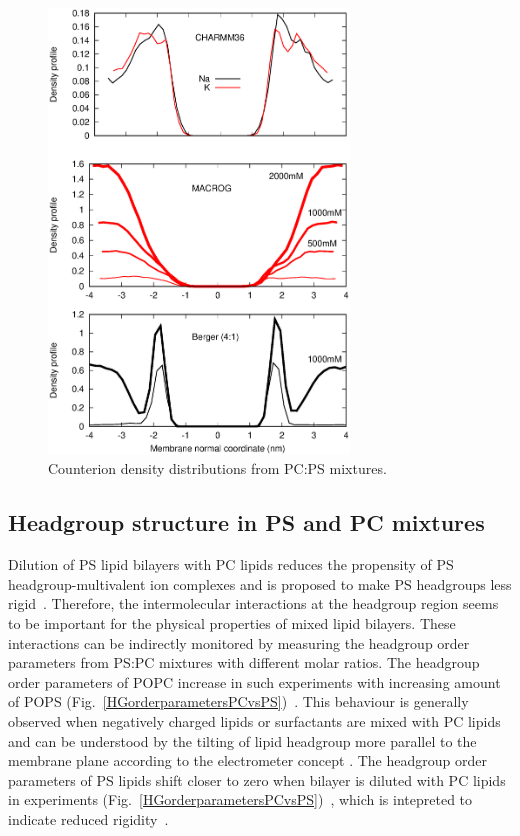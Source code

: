 \documentclass[aps,prl,superscriptaddress,twocolumn]{revtex4}
\begin{document}
\begin{figure}[]
  \centering
  \includegraphics[width=8.0cm]{../Figs/CIdensPSOCmixt.eps}
  \caption{  Counterion density distributions from PC:PS mixtures.
\label{CIdensPSOCmixt}
  }
\end{figure}




\subsection{Headgroup structure in PS and PC mixtures}
Dilution of PS lipid bilayers with PC lipids reduces the propensity
of PS headgroup-multivalent ion complexes and is proposed to make PS
headgroups less rigid~\cite{browning80,buldt81,roux90,roux91}.
Therefore, the intermolecular interactions at the headgroup region seems
to be important for the physical properties of mixed lipid bilayers.
These interactions can be indirectly monitored by measuring the
headgroup order parameters from PS:PC mixtures with different molar
ratios. The headgroup order parameters of POPC increase in such experiments 
with increasing amount of POPS (Fig.~\ref{HGorderparametersPCvsPS})~\cite{scherer87}. 
This behaviour is generally observed when negatively charged lipids or surfactants 
are mixed with PC lipids~\cite{scherer87,scherer89} and can be understood by the 
tilting of lipid headgroup more parallel to the membrane plane according to
the electrometer concept \cite{seelig87}. The headgroup order parameters of PS lipids
shift closer to zero when bilayer is diluted with PC lipids in 
experiments (Fig.~\ref{HGorderparametersPCvsPS})~\cite{browning80,scherer87,roux90},
which is intepreted to indicate reduced rigidity~\cite{browning80,buldt81}.
\end{document}

